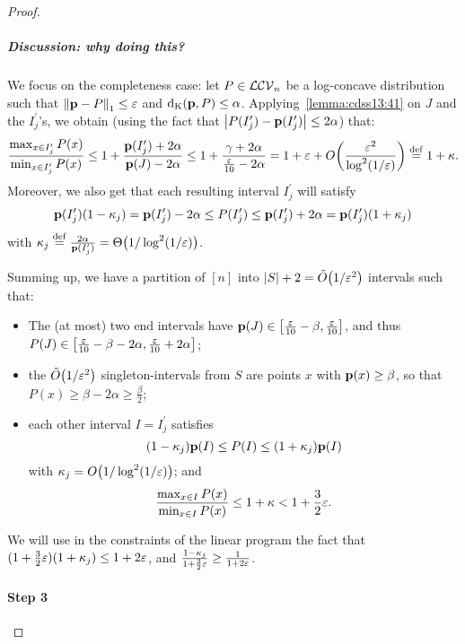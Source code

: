 \begin{proof}
\subparagraph{Discussion: why doing this?}\label{ssec:logconcave:completeness}
We focus on the completeness case: let $P\in\mathcal{LCV}_{n}$ be a log-concave distribution such that ${\lVert\mathbf{p}-P{\rVert}}_1 \leq \varepsilon$ and ${\operatorname{d_{\textrm{K}}}\!\left({\mathbf{p}, P}\right)} \leq \alpha$.
Applying~\cref{lemma:cdss13:41} on $J$ and the $I^\prime_j$'s, we obtain (using the fact that $\left\lvert P(I^\prime_j) - \mathbf{p}(I^\prime_j) \right\rvert \leq 2\alpha$) that:
\[
    \frac{\max_{x\in I^\prime_j} P(x)}{\min_{x\in I^\prime_j} P(x)} 
    \leq 1+\frac{\D(I^\prime_j)+2\alpha}{\D(J)-2\alpha} 
    \leq 1 + \frac{\gamma+2\alpha}{\frac{\eps}{10}-2\alpha}
    = 1+ \eps + \bigO{\frac{\eps^2}{\log^2(1/\eps)}} \eqdef 1+\kappa.
\]
Moreover, we also get that each resulting interval $I^\prime_j$ will satisfy
\[
      \mathbf{p}(I^\prime_j)(1-\kappa_j) = \mathbf{p}(I^\prime_j)-2\alpha \leq P(I^\prime_j) \leq \mathbf{p}(I^\prime_j)+2\alpha = \mathbf{p}(I^\prime_j)(1+\kappa_j)
\]
with $\kappa_j \eqdef \frac{2\alpha}{\D(I^\prime_j)} = \bigTheta{1/\log^2(1/\eps)}$.\medskip

Summing up, we have a partition of $[n]$ into $\abs{S}+2 = \tildeO{1/\eps^2}$ intervals such that:
\begin{itemize}
  \item The (at most) two end intervals have $\mathbf{p}(J)\in\left[\frac{\varepsilon}{10}-\beta, \frac{\varepsilon}{10}\right]$, and thus $P(J)\in\left[\frac{\varepsilon}{10}-\beta-2\alpha, \frac{\varepsilon}{10}+2\alpha\right]$;
  \item the $\tildeO{1/\eps^2}$ singleton-intervals from $S$ are points $x$ with $\mathbf{p}(x) \geq \beta$, so that $P(x) \geq \beta -2\alpha \geq \frac{\beta}{2}$;
  \item each other interval $I=I^\prime_j$ satisfies 
  \begin{equation}\label{eq:logconcave:completeness:1}
    (1-\kappa_j) \mathbf{p}(I) \leq P(I) \leq (1+\kappa_j) \mathbf{p}(I)
  \end{equation}
  with $\kappa_j=\bigO{1/\log^2(1/\eps)}$; and
  \begin{equation}\label{eq:logconcave:completeness:2}
  \frac{\max_{x\in I}P(x)}{\min_{x\in I}P(x)} \leq 1+\kappa < 1+\frac{3}{2}\varepsilon.
  \end{equation}
\end{itemize}
We will use in the constraints of the linear program the fact that $(1+\frac{3}{2}\varepsilon)(1+\kappa_j) \leq 1+2\varepsilon$, and $\frac{1-\kappa_j}{1+\frac{3}{2}\varepsilon} \geq \frac{1}{1+2\varepsilon}$.

\paragraph{Step 3}\label{stage:3}


\end{proof}
